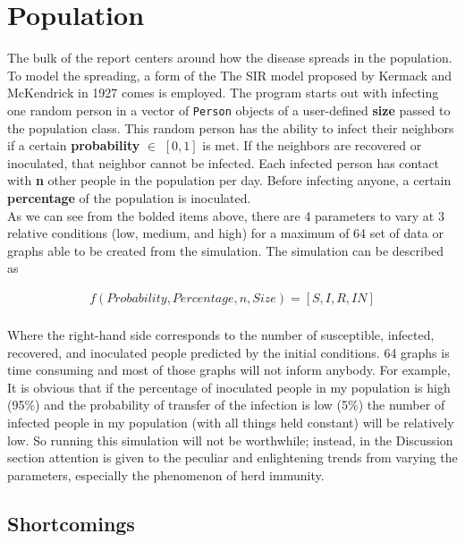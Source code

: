 \documentclass[paper=a4, fontsize=11pt]{scrartcl}
\begin{document}
\section{Population}

The bulk of the report centers around how the disease spreads in the population. To model the spreading, a form of the The SIR model proposed by Kermack and McKendrick in 1927 comes is employed. The program starts out with infecting one random person in a vector of \texttt{Person} objects of a user-defined  \textbf{size} passed to the population class. This random person has the ability to infect their neighbors if a certain \textbf{probability} $\in$ $[0,1]$ is met. If the neighbors are recovered or inoculated, that neighbor cannot be infected. Each infected person has contact with \textbf{n} other people in the population per day. Before infecting anyone, a certain \textbf{percentage} of the population is inoculated.\\

As we can see from the bolded items above, there are 4 parameters to vary at 3 relative conditions (low, medium, and high) for a maximum of 64 set of data or graphs able to be created from the simulation. The simulation can be described as

\begin{align*} 
   f(Probability, Percentage, n, Size) = [S,I,R,IN] \\
\end{align*}

Where the right-hand side corresponds to the number of susceptible, infected, recovered, and inoculated people predicted by the initial conditions. 64 graphs is time consuming and most of those graphs will not inform anybody. For example, It is obvious that if the percentage of inoculated people in my population is high (95\%) and the probability of transfer of the infection is low (5\%) the number of infected people in my population (with all things held constant) will be relatively low. So running this simulation will not be worthwhile; instead, in the Discussion section attention is given to the peculiar and enlightening trends from varying the parameters, especially the phenomenon of herd immunity.\\

\subsection{Shortcomings}
\end{document}
